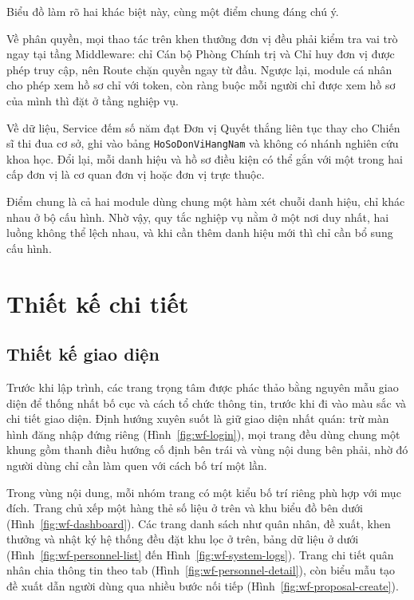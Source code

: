 \documentclass[../DoAn.tex]{subfiles}
\begin{document}
Biểu đồ làm rõ hai khác biệt này, cùng một điểm chung đáng chú ý.

Về phân quyền, mọi thao tác trên khen thưởng đơn vị đều phải kiểm tra vai trò ngay tại tầng Middleware: chỉ Cán bộ Phòng Chính trị và Chỉ huy đơn vị được phép truy cập, nên Route chặn quyền ngay từ đầu. Ngược lại, module cá nhân cho phép xem hồ sơ chỉ với token, còn ràng buộc mỗi người chỉ được xem hồ sơ của mình thì đặt ở tầng nghiệp vụ.

Về dữ liệu, Service đếm số năm đạt Đơn vị Quyết thắng liên tục thay cho Chiến sĩ thi đua cơ sở, ghi vào bảng \texttt{HoSoDonViHangNam} và không có nhánh nghiên cứu khoa học. Đổi lại, mỗi danh hiệu và hồ sơ điều kiện có thể gắn với một trong hai cấp đơn vị là cơ quan đơn vị hoặc đơn vị trực thuộc.

Điểm chung là cả hai module dùng chung một hàm xét chuỗi danh hiệu, chỉ khác nhau ở bộ cấu hình. Nhờ vậy, quy tắc nghiệp vụ nằm ở một nơi duy nhất, hai luồng không thể lệch nhau, và khi cần thêm danh hiệu mới thì chỉ cần bổ sung cấu hình.

\section{Thiết kế chi tiết}
\label{section:4.2}

\subsection{Thiết kế giao diện}
\label{subsection:4.2.1}

Trước khi lập trình, các trang trọng tâm được phác thảo bằng nguyên mẫu giao diện để thống nhất bố cục và cách tổ chức thông tin, trước khi đi vào màu sắc và chi tiết giao diện. Định hướng xuyên suốt là giữ giao diện nhất quán: trừ màn hình đăng nhập đứng riêng (Hình~\ref{fig:wf-login}), mọi trang đều dùng chung một khung gồm thanh điều hướng cố định bên trái và vùng nội dung bên phải, nhờ đó người dùng chỉ cần làm quen với cách bố trí một lần.

Trong vùng nội dung, mỗi nhóm trang có một kiểu bố trí riêng phù hợp với mục đích. Trang chủ xếp một hàng thẻ số liệu ở trên và khu biểu đồ bên dưới (Hình~\ref{fig:wf-dashboard}). Các trang danh sách như quân nhân, đề xuất, khen thưởng và nhật ký hệ thống đều đặt khu lọc ở trên, bảng dữ liệu ở dưới (Hình~\ref{fig:wf-personnel-list} đến Hình~\ref{fig:wf-system-logs}). Trang chi tiết quân nhân chia thông tin theo tab (Hình~\ref{fig:wf-personnel-detail}), còn biểu mẫu tạo đề xuất dẫn người dùng qua nhiều bước nối tiếp (Hình~\ref{fig:wf-proposal-create}).
\end{document}
